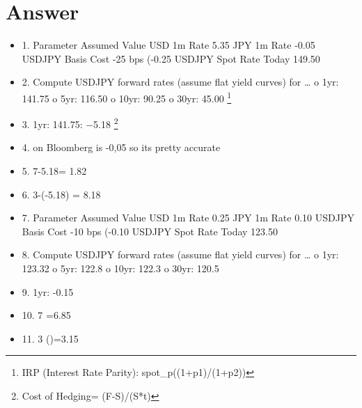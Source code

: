 \documentclass[12pt]{article}
\begin{document}
\section*{Answer}
\begin{itemize}

\item 1. Parameter	Assumed Value
\SubItem USD 1m Rate	5.35%
\SubItem JPY 1m Rate	-0.05%
\SubItem USDJPY Basis Cost	-25 bps (-0.25%
\SubItem USDJPY Spot Rate Today	149.50

\item 2. Compute USDJPY forward rates (assume flat yield curves) for …
\SubItem o 1yr: 141.75
\SubItem o 5yr: 116.50
\SubItem o 10yr: 90.25
\SubItem o 30yr: 45.00
\footnote{IRP (Interest Rate Parity): spot_p((1+p1)/(1+p2))} 
\item 3. 1yr: 141.75: −5.18%
\footnote{Cost of Hedging= (F-S)/(S*t)}
\item 4. on Bloomberg is -0,05 so its pretty accurate
\item 5. 7-5.18= 1.82%
\item 6. 3-(-5.18) = 8.18%
\item 7. Parameter	Assumed Value
\SubItem USD 1m Rate	0.25%
\SubItem JPY 1m Rate	0.10%
\SubItem USDJPY Basis Cost	-10 bps (-0.10%
\SubItem USDJPY Spot Rate Today	123.50

\item 8. Compute USDJPY forward rates (assume flat yield curves) for …
\SubItem o 1yr: 123.32
\SubItem o 5yr: 122.8
\SubItem o 10yr: 122.3
\SubItem o 30yr: 120.5
\item 9. 1yr: -0.15%
\item 10. 7 =6.85%
\item 11.  3 \textminus()=3.15%

\end{itemize}
\end{document}

